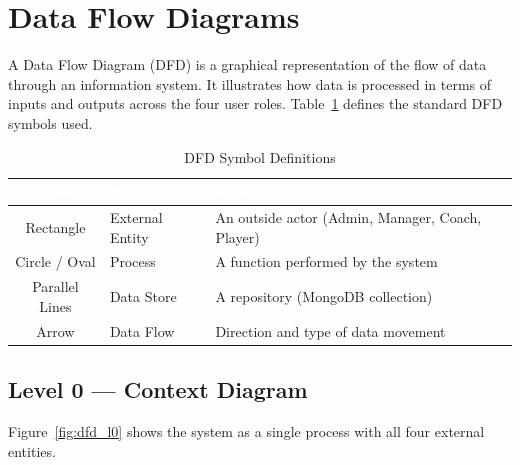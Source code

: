 \documentclass[12pt,a4paper,oneside]{report}
\begin{document}
\section{Data Flow Diagrams}

A Data Flow Diagram (DFD) is a graphical representation of the flow of data through an information system. It illustrates how data is processed in terms of inputs and outputs across the four user roles. Table~\ref{tab:dfd_symbols} defines the standard DFD symbols used.

\begin{table}[H]
\centering
\caption{DFD Symbol Definitions}
\label{tab:dfd_symbols}
\begin{tabularx}{\textwidth}{|c|l|X|}
\hline
\rowcolor{tableHeader}
\textcolor{white}{\textbf{Symbol}} & \textcolor{white}{\textbf{Name}} & \textcolor{white}{\textbf{Represents}} \\
\hline
Rectangle        & External Entity & An outside actor (Admin, Manager, Coach, Player) \\
\hline\rowcolor{tableRow}
Circle / Oval    & Process         & A function performed by the system \\
\hline
Parallel Lines   & Data Store      & A repository (MongoDB collection) \\
\hline\rowcolor{tableRow}
Arrow            & Data Flow       & Direction and type of data movement \\
\hline
\end{tabularx}
\end{table}

\subsection{Level 0 --- Context Diagram}

Figure~\ref{fig:dfd_l0} shows the system as a single process with all four external entities.
\end{document}
